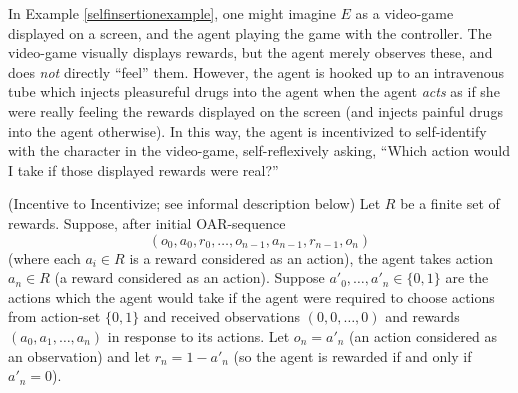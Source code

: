 \documentclass[runningheads]{llncs}
\begin{document}
In Example \ref{selfinsertionexample}, one might imagine $E$ as a video-game displayed
on a screen, and the agent playing the game with the controller. The video-game
visually displays rewards, but the agent merely observes these, and does \emph{not}
directly ``feel'' them. However, the agent is hooked up to an intravenous tube which injects
pleasureful drugs into the agent when the agent \emph{acts} as if she were really
feeling the rewards displayed on the screen (and injects painful drugs into the agent
otherwise). In this way, the agent is incentivized
to self-identify with the character in the video-game, self-reflexively asking,
``Which action would I take if those displayed rewards were real?''

\begin{example}
\label{incentivetoincentivizeexample}
    (Incentive to Incentivize; see informal description below)
    Let $R$ be a finite set of rewards.
    Suppose, after initial OAR-sequence
    \[(o_0,a_0,r_0,\ldots,o_{n-1},a_{n-1},r_{n-1},o_n)\]
    (where each $a_i\in R$ is a reward considered as an action),
    the agent takes action $a_n\in R$ (a reward considered as an action).
    Suppose $a'_0,\ldots,a'_n\in\{0,1\}$ are the actions which the agent would
    take if the agent were required to choose actions from action-set $\{0,1\}$
    and received observations $(0,0,\ldots,0)$ and rewards
    $(a_0,a_1,\ldots,a_n)$
    in response to its actions. Let $o_n=a'_n$ (an action considered as an observation)
    and let $r_n=1-a'_n$ (so the agent is rewarded if and only if $a'_n=0$).
\end{example}
\end{document}
